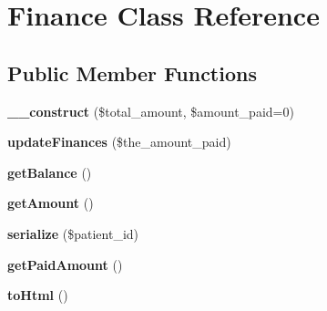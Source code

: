 \hypertarget{classFinance}{\section{Finance Class Reference}
\label{classFinance}
}
\subsection*{Public Member Functions}
\begin{DoxyCompactItemize}
\item 
\hypertarget{classFinance_acfd7dd192b5c76773a6226a2605b6566}{{\bfseries \-\_\-\-\_\-construct} (\$total\-\_\-amount, \$amount\-\_\-paid=0)}\label{classFinance_acfd7dd192b5c76773a6226a2605b6566}

\item 
\hypertarget{classFinance_adc862683c88b3c49c5e126d1a21bddc8}{{\bfseries update\-Finances} (\$the\-\_\-amount\-\_\-paid)}\label{classFinance_adc862683c88b3c49c5e126d1a21bddc8}

\item 
\hypertarget{classFinance_ae8e175ffab07397e7cf03f444cec2d73}{{\bfseries get\-Balance} ()}\label{classFinance_ae8e175ffab07397e7cf03f444cec2d73}

\item 
\hypertarget{classFinance_a1ca338a3e0c2b44cc6333f7c851d367b}{{\bfseries get\-Amount} ()}\label{classFinance_a1ca338a3e0c2b44cc6333f7c851d367b}

\item 
\hypertarget{classFinance_aca89fff1f7f838c8327b7c840304ebb4}{{\bfseries serialize} (\$patient\-\_\-id)}\label{classFinance_aca89fff1f7f838c8327b7c840304ebb4}

\item 
\hypertarget{classFinance_a6aa198a4372c9f13a219d2ca6c109b12}{{\bfseries get\-Paid\-Amount} ()}\label{classFinance_a6aa198a4372c9f13a219d2ca6c109b12}

\item 
\hypertarget{classFinance_ad1e6bdeea2de1d63d5b9eb800efc3e20}{{\bfseries to\-Html} ()}\label{classFinance_ad1e6bdeea2de1d63d5b9eb800efc3e20}

\end{DoxyCompactItemize}
